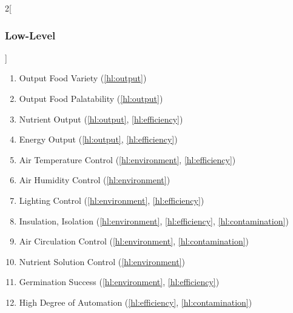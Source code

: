 \documentclass{report}
\begin{document}
\begin{multicols}{2}[\subsubsection{Low-Level}\label{sec:llos}]
    \begin{enumerate}[label=LL\arabic*., ref=LL\arabic*]
        \item \label{ll:output_variety} Output Food Variety \hfill (\ref{hl:output})
        \item \label{ll:output_palatability} Output Food Palatability \hfill (\ref{hl:output})
        \item \label{ll:output_nutrients} Nutrient Output \hfill (\ref{hl:output}, \ref{hl:efficiency})
        \item \label{ll:output_energy} Energy Output \hfill (\ref{hl:output}, \ref{hl:efficiency})
        \item \label{ll:control_airtemp} Air Temperature Control \hfill (\ref{hl:environment}, \ref{hl:efficiency})
        \item \label{ll:control_airhum} Air Humidity Control \hfill (\ref{hl:environment})
        \item \label{ll:control_light} Lighting Control \hfill (\ref{hl:environment}, \ref{hl:efficiency})
        \item \label{ll:insulateisolate} Insulation, Isolation \hfill (\ref{hl:environment}, \ref{hl:efficiency}, \ref{hl:contamination})
        \item \label{ll:control_aircirculation} Air Circulation Control \hfill (\ref{hl:environment}, \ref{hl:contamination})
        \item \label{ll:control_nutrientsolution} Nutrient Solution Control \hfill (\ref{hl:environment})
        \item \label{ll:germinationsuccess} Germination Success \hfill (\ref{hl:environment}, \ref{hl:efficiency})
        \item \label{ll:automation} High Degree of Automation \hfill (\ref{hl:efficiency}, \ref{hl:contamination})

\end{enumerate}
\end{multicols}
\end{document}
